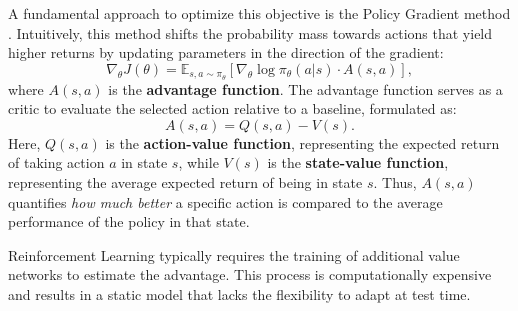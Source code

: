 A fundamental approach to optimize this objective is the Policy Gradient method \citep{reinforce, policy-gradient}. Intuitively, this method shifts the probability mass towards actions that yield higher returns by updating parameters in the direction of the gradient:
\begin{equation}
    \nabla_{\theta} J(\theta) = \mathbb{E}_{s,a \sim \pi_{\theta}} [\nabla_{\theta} \log \pi_{\theta}(a|s) \cdot A(s,a)],
    \label{eq:policy_gradient}
\end{equation}
where $A(s,a)$ is the \textbf{advantage function}. The advantage function serves as a critic to evaluate the selected action relative to a baseline, formulated as:
\begin{equation}
    A(s,a) = Q(s,a) - V(s).
    \label{eq:advantage_def}
\end{equation}
Here, $Q(s,a)$ is the \textbf{action-value function}, representing the expected return of taking action $a$ in state $s$, while $V(s)$ is the \textbf{state-value function}, representing the average expected return of being in state $s$. Thus, $A(s,a)$ quantifies \textit{how much better} a specific action is compared to the average performance of the policy in that state.

Reinforcement Learning typically requires the training of additional value networks to estimate the advantage. This process is computationally expensive and results in a static model that lacks the flexibility to adapt at test time.